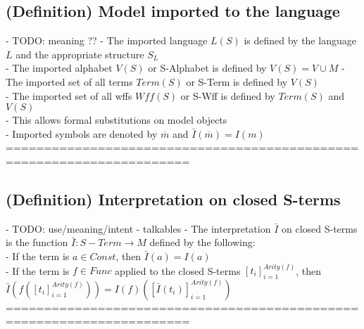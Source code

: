 \documentclass{article}
\begin{document}
\subsection{(Definition) Model imported to the language}
	- TODO: meaning ??
	- The imported language $L(S)$ is defined by the language $L$ and the appropriate structure $S_L$ \\
	- The imported alphabet $V(S)$ or S-Alphabet is defined by $V(S) = V \cup M$
	- The imported set of all terms $Term(S)$ or S-Term is defined by $V(S)$ \\
	- The imported set of all wffs $Wff(S)$ or S-Wff is defined by $Term(S)$ and $V(S)$ \\
	- This allows formal substitutions on model objects \\
	- Imported symbols are denoted by $\overline m$ and $\bar I(\overline m) = I(m)$ \\
	======================================================================
\subsection{(Definition) Interpretation on closed S-terms}
	- TODO: use/meaning/intent - talkables
	- The interpretation $\bar I$ on closed S-terms is the function $\bar I: S-Term \rightarrow M$ defined by the following: \\
		- If the term is $a \in Const$, then $\bar I(a) = I(a)$ \\
		- If the term is $f \in Func$ applied to the closed S-terms $[t_i]_{i=1}^{Arity(f)}$, then $\bar I\left(f([t_i]_{i=1}^{Arity(f)})\right) = I(f)\left([\bar I(t_i)]_{i=1}^{Arity(f)}\right)$ \\
	======================================================================
\end{document}
